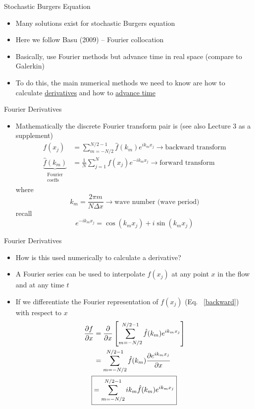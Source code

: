 \begin{frame}{Stochastic Burgers Equation}
\begin{itemize}
	\item Many solutions exist for stochastic Burgers equation
	\item Here we follow Basu (2009) -- Fourier collocation
	\item Basically, use Fourier methods but advance time in real space (compare to Galerkin)
	\item To do this, the main numerical methods we need to know are how to calculate \underline{derivatives} and how to \underline{advance time}
\end{itemize}

\end{frame}

\begin{frame}{Fourier Derivatives}

\begin{itemize}
	\item Mathematically the discrete Fourier transform pair is (see also Lecture 3 as a supplement)
	\begin{align}
		\label{backward}
		f(x_j) &= \sum^{N/2 -1}_{m = -N/2} \hat f(k_m) e^{i k_m x_j} \rightarrow \text{backward transform}\\
		\label{forward}
		\underbrace{\hat f(k_m)}_{\substack{\text{Fourier}\\\text{coeffs}}} &= \frac{1}{N} \sum^N_{j=1} f(x_j) e^{-i k_m x_j} \rightarrow \text{forward transform}
	\end{align}
	where
	$$k_m = \frac{2\pi m}{N\Delta x} \rightarrow \text{wave number (wave period)}$$
	recall
	$$e^{-ik_mx_j} = \cos (k_mx_j) + i\sin (k_m x_j)$$
\end{itemize}

\end{frame}

\begin{frame}{Fourier Derivatives}
\begin{itemize}
	\item How is this used numerically to calculate a derivative?
	\item  A Fourier series can be used to interpolate $f(x_j)$ at any point $x$ in the flow and at any time $t$
	\item  If we differentiate the Fourier representation of $f(x_j)$ (Eq. ~\ref{backward}) with respect to $x$
	\begin{align*}
	\frac{\partial f}{\partial x} &= \frac{\partial}{\partial x} \left[ \sum^{N/2 -1}_{m = -N/2} \hat f(k_m) e^{i k_m x_j} \right]\\
	&= \sum^{N/2 -1}_{m = -N/2} \hat f(k_m) \frac{\partial e^{i k_m x_j}}{\partial x}\\
	\Aboxed{&=\sum^{N/2 -1}_{m = -N/2} i k_m \hat f(k_m) e^{i k_m x_j}}
	\end{align*}
	\end{itemize}
\end{frame}

